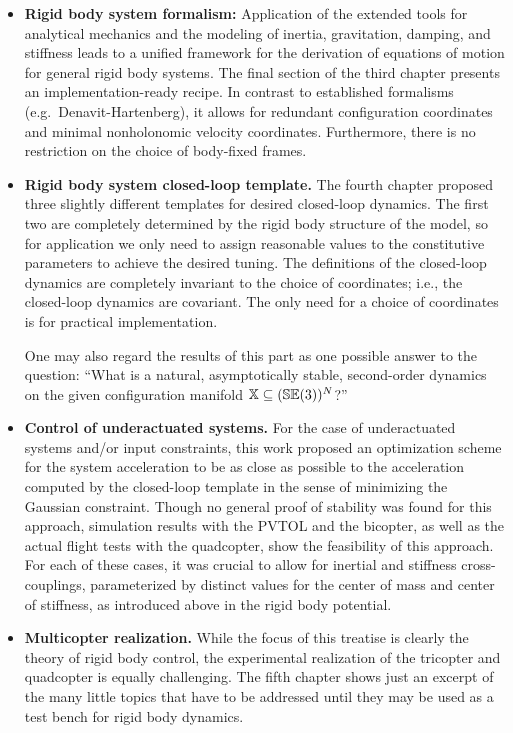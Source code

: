 \begin{itemize}
The rigid body potential can generally be useful as a natural cost function for optimization problems over $\SpecialEuclideanGroup(3)$, e.g.\ in an extension of Wahba's problem that is omnipresent in navigation.

\item \textbf{Rigid body system formalism:}
Application of the extended tools for analytical mechanics and the modeling of inertia, gravitation, damping, and stiffness leads to a unified framework for the derivation of equations of motion for general rigid body systems.
The final section of the third chapter presents an implementation-ready recipe.
In contrast to established formalisms (e.g.\ Denavit-Hartenberg), it allows for redundant configuration coordinates and minimal nonholonomic velocity coordinates.
Furthermore, there is no restriction on the choice of body-fixed frames.

\item \textbf{Rigid body system closed-loop template.}
The fourth chapter proposed three slightly different templates for desired closed-loop dynamics.
The first two are completely determined by the rigid body structure of the model, so for application we only need to assign reasonable values to the constitutive parameters to achieve the desired tuning.
The definitions of the closed-loop dynamics are completely invariant to the choice of coordinates; i.e., the closed-loop dynamics are covariant.
The only need for a choice of coordinates is for practical implementation.

One may also regard the results of this part as one possible answer to the question: ``What is a natural, asymptotically stable, second-order dynamics on the given configuration manifold $\mathbb{X} \subseteq (\mathbb{SE}(3))^N$?''

\item \textbf{Control of underactuated systems.}
For the case of underactuated systems and/or input constraints, this work proposed an optimization scheme for the system acceleration to be as close as possible to the acceleration computed by the closed-loop template in the sense of minimizing the Gaussian constraint.
Though no general proof of stability was found for this approach, simulation results with the PVTOL and the bicopter, as well as the actual flight tests with the quadcopter, show the feasibility of this approach.
For each of these cases, it was crucial to allow for inertial and stiffness cross-couplings, parameterized by distinct values for the center of mass and center of stiffness, as introduced above in the rigid body potential.

\item \textbf{Multicopter realization.}
While the focus of this treatise is clearly the theory of rigid body control, the experimental realization of the tricopter and quadcopter is equally challenging.
The fifth chapter shows just an excerpt of the many little topics that have to be addressed until they may be used as a test bench for rigid body dynamics.

\end{itemize}

